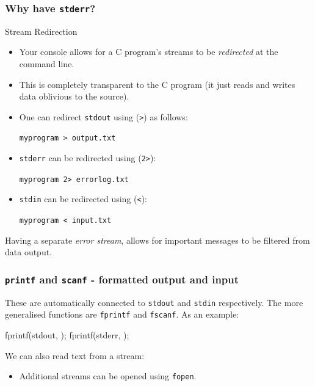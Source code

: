 \documentclass[smaller,table]{beamer}
\begin{document}
\begin{frame}
\frametitle{Why have {\tt stderr}?}
\begin{exampleblock}{Stream Redirection}
\begin{itemize}
\item Your console allows for a C program's streams to be \emph{redirected} at the command line.
\item This is completely transparent to the C program (it just reads and writes data oblivious to the source).
\item One can redirect {\tt stdout} using ({\tt >}) as follows:
\begin{center}
\tt myprogram > output.txt
\end{center}
\item {\tt stderr} can be redirected using ({\tt 2>}):
\begin{center}
\tt myprogram 2> errorlog.txt
\end{center}
\item {\tt stdin} can be redirected using ({\tt <}):
\begin{center}
\tt myprogram < input.txt
\end{center}
\end{itemize}
\end{exampleblock}
Having a separate \emph{error stream}, allows for important messages to be filtered from data output.
\end{frame}


\begin{frame}[fragile]
\frametitle{{\tt printf} and {\tt scanf} - formatted output and input}
These are automatically connected to {\tt stdout} and {\tt stdin} respectively. The more generalised functions are {\tt fprintf} and {\tt fscanf}. As an example:
\begin{semiverbatim}
fprintf(stdout, );
fprintf(stderr, );
\end{semiverbatim}
We can also read text from a stream:
\begin{itemize}
\item Additional streams can be opened using {\tt fopen}.
\end{itemize}
\end{frame}
\end{document}
